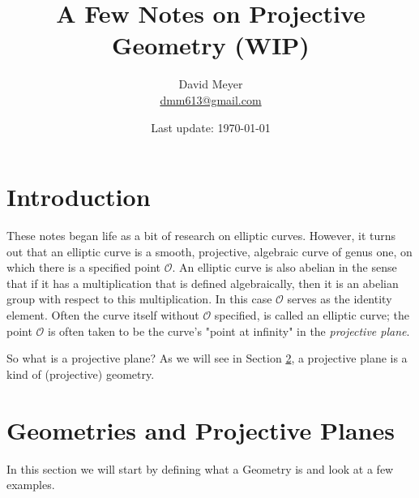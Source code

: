 \documentclass{article}
\title{A Few Notes on Projective Geometry (WIP)}
\author{David Meyer \\ \href{mailto:dmm613@gmail.com}
                            {dmm613@gmail.com}}
\date{Last update: \today}
\theoremstyle{definition}
\begin{document}
\maketitle

\section{Introduction}
These notes began life as a bit of research on elliptic curves. However, it turns out that an elliptic curve is a smooth, projective, algebraic curve of genus one, on which there is a specified point $\mathcal{O}$. An elliptic curve is also abelian in the sense that if it has a multiplication that is defined algebraically, then it is an abelian group with respect to 
this multiplication. In this case $\mathcal{O}$ serves as the identity element. Often the curve itself without $\mathcal{O}$ specified, is called an elliptic curve; the point $\mathcal{O}$ is often taken to be the curve's "point at infinity" in the \emph{projective plane}. 

\bigskip
\noindent
So what is a projective plane? As we will see in Section \ref{sec:projective_plane}, a projective plane is a kind of (projective) geometry. 


\section{Geometries and Projective Planes}
\label{sec:projective_plane}
In this section we will start by defining what a Geometry is and look at a few examples.
\end{document}

